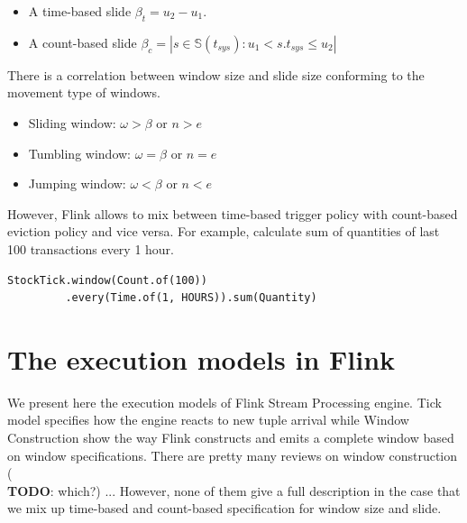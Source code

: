 \begin{enumerate}
\begin{defi}
\begin{itemize}
\item  A time-based slide $\beta_{t} = u_2 - u_1$.  
\item A count-based slide $\beta_{c} = |{s \in \mathbb{S}(t_{sys}): u_1 < s.t_{sys} \leq u_2}| $ 

\end{itemize}

\end{defi}

\end{enumerate}

There is a correlation between window size and slide size  conforming to the movement type of windows.
\begin{itemize}
\item Sliding window: $\omega > \beta$ or $n > e$
\item Tumbling window: $\omega = \beta$ or $n = e$
\item Jumping window: $\omega < \beta$ or $n < e$
\end{itemize}

However, Flink allows to mix between time-based trigger policy with count-based eviction policy and vice versa. For example,
calculate sum of quantities of last 100 transactions every 1 hour.
\begin{verbatim}
StockTick.window(Count.of(100))
		 .every(Time.of(1, HOURS)).sum(Quantity)
\end{verbatim}

\section{The execution models in Flink}
We present here the execution models of Flink Stream Processing engine. Tick model specifies how the engine reacts to new tuple arrival while Window Construction show the way Flink constructs and emits a complete window based on window specifications. There are pretty many reviews on window construction (\textbf{\\TODO}: which?) ... However, none of them give a full description in the case that we mix up time-based and count-based specification for window size and slide.  


%
%
%
%
%

